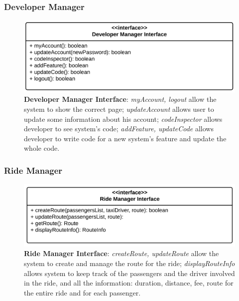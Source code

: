 \subsubsection{Developer Manager}
\begin{figure}[htbp]
\centering
\includegraphics[width=\textwidth]{cpt/img/ComponentInterfacesDeveloperManagerInterface}
\caption{\textbf{Developer Manager Interface}: \textit{myAccount, logout} allow the system to show the correct page; \textit{updateAccount} allows user to update some information about his account; \textit{codeInspector} allows developer to see system's code; \textit{addFeature, updateCode} allows developer to write code for a new system's feature and update the whole code.
}
\end{figure}
\clearpage

\subsubsection{Ride Manager}
\begin{figure}[htbp]
\centering
\includegraphics[width=\textwidth]{cpt/img/ComponentInterfacesRideManagerInterface}
\caption{\textbf{Ride Manager Interface}: \textit{createRoute, updateRoute} allow the system to create and manage the route for the ride; \textit{displayRouteInfo} allows system to keep track of the passengers and the driver involved in the ride, and all the information: duration, distance, fee, route for the entire ride and for each passenger.
}
\end{figure}
\clearpage

